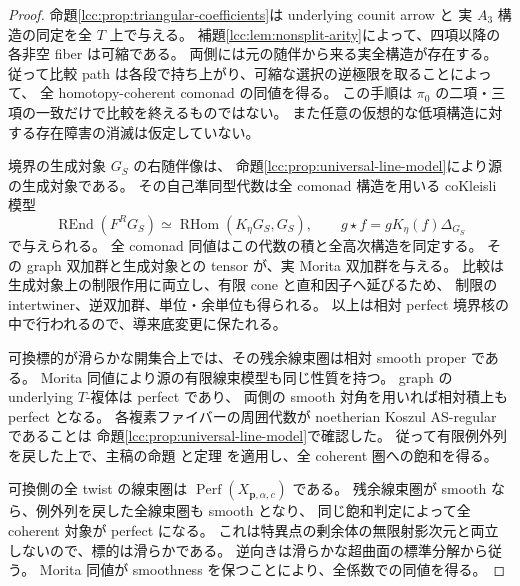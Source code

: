 \begin{proof}
命題\ref{lcc:prop:triangular-coefficients}は underlying counit arrow と
実 $A_3$ 構造の同定を全 $T$ 上で与える。
補題\ref{lcc:lem:nonsplit-arity}によって、四項以降の各非空 fiber は可縮である。
両側には元の随伴から来る実全構造が存在する。
従って比較 path は各段で持ち上がり、可縮な選択の逆極限を取ることによって、
全 homotopy-coherent comonad の同値を得る。
この手順は $\pi_0$ の二項・三項の一致だけで比較を終えるものではない。
また任意の仮想的な低項構造に対する存在障害の消滅は仮定していない。

境界の生成対象 $G_S$ の右随伴像は、
命題\ref{lcc:prop:universal-line-model}により源の生成対象である。
その自己準同型代数は全 comonad 構造を用いる coKleisli 模型
\[
 \operatorname{REnd}(F^RG_S)
 \simeq\operatorname{RHom}(K_\eta G_S,G_S),\qquad
 g\star f=gK_\eta(f)\Delta_{G_S}
\]
で与えられる。
全 comonad 同値はこの代数の積と全高次構造を同定する。
その graph 双加群と生成対象との tensor が、実 Morita 双加群を与える。
比較は生成対象上の制限作用に両立し、有限 cone と直和因子へ延びるため、
制限の intertwiner、逆双加群、単位・余単位も得られる。
以上は相対 perfect 境界核の中で行われるので、導来底変更に保たれる。

可換標的が滑らかな開集合上では、その残余線束圏は相対 smooth proper である。
Morita 同値により源の有限線束模型も同じ性質を持つ。
graph の underlying $T$-複体は perfect であり、
両側の smooth 対角を用いれば相対積上も perfect となる。
各複素ファイバーの周囲代数が noetherian Koszul AS-regular であることは
命題\ref{lcc:prop:universal-line-model}で確認した。
従って有限例外列を戻した上で、主稿の命題
と定理
を適用し、全 coherent 圏への飽和を得る。

可換側の全 twist の線束圏は $\operatorname{Perf}(X_{\mathbf p,\alpha,c})$ である。
残余線束圏が smooth なら、例外列を戻した全線束圏も smooth となり、
同じ飽和判定によって全 coherent 対象が perfect になる。
これは特異点の剰余体の無限射影次元と両立しないので、標的は滑らかである。
逆向きは滑らかな超曲面の標準分解から従う。
Morita 同値が smoothness を保つことにより、全係数での同値を得る。
\end{proof}

